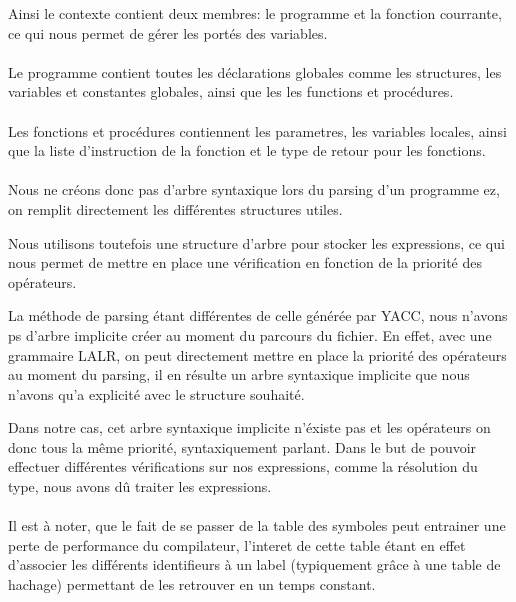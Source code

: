 Ainsi le contexte contient deux membres: le programme et la fonction courrante, ce qui nous permet de 
gérer les portés des variables.

\paragraph{}Le programme contient toutes les déclarations globales comme les structures, les variables
et constantes globales, ainsi que les les functions et procédures.

\paragraph{}Les fonctions et procédures contiennent les parametres, les variables locales, ainsi que 
la liste d'instruction de la fonction et le type de retour pour les fonctions.

\paragraph{}Nous ne créons donc pas d'arbre syntaxique lors du parsing d'un programme ez, on remplit
directement les différentes structures utiles. 

Nous utilisons toutefois une structure d'arbre pour stocker les expressions, ce qui nous permet 
de mettre en place une vérification en fonction de la priorité des opérateurs.

La méthode de parsing étant différentes de celle générée par YACC, nous n'avons ps d'arbre
implicite créer au moment du parcours du fichier. En effet, avec une grammaire LALR, on peut directement
mettre en place la priorité des opérateurs au moment du parsing, il en résulte un arbre syntaxique
implicite que nous n'avons qu'a explicité avec le structure souhaité.

Dans notre cas, cet arbre syntaxique implicite n'éxiste pas et les opérateurs on donc tous la même priorité,
syntaxiquement parlant. Dans le but de pouvoir effectuer différentes vérifications sur nos expressions, comme la résolution
du type, nous avons dû traiter les expressions.


\paragraph{}Il est à noter, que le fait de se passer de la table des symboles peut entrainer 
une perte de performance du compilateur, l'interet de cette table étant en effet d'associer les 
différents identifieurs à un label (typiquement grâce à une table de hachage) permettant de les 
retrouver en un temps constant.

